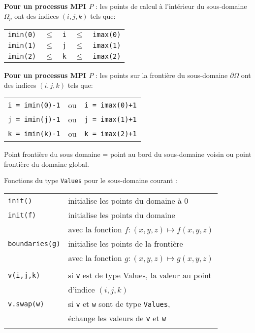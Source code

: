 \documentclass{beamer}
\begin{document}
\begin{frame}
	
\vfill
{\bf Pour un processus MPI $P$} : les points de calcul à l'intérieur du sous-domaine $\Omega_p$ ont des indices $(i,j,k)$ tels que:
\bigskip

\begin{tabular}{lclcl}
	{\tt imin(0)} & $\leq$ & {\tt i} & $\leq$ & {\tt imax(0)} \\
	{\tt imin(1)} & $\leq$ & {\tt j} & $\leq$ & {\tt imax(1)} \\
	{\tt imin(2)} & $\leq$ & {\tt k} & $\leq$ & {\tt imax(2)} \\
\end{tabular}
\vfill

{\bf Pour un processus MPI $P$} : les points sur la frontière du sous-domaine $\partial\Omega$ ont des indices $(i,j,k)$ tels que:
\bigskip

\begin{tabular}{lcl}
	{\tt i = imin(0)-1} & ou & {\tt i = imax(0)+1}  \\
	{\tt j = imin(j)-1} & ou & {\tt j = imax(1)+1}  \\
	{\tt k = imin(k)-1} & ou & {\tt k = imax(2)+1} 
\end{tabular}

\vfill
Point frontière du sous domaine = point au bord du sous-domaine voisin ou point frontière du domaine global.
\vfill
	
	
\end{frame}

\begin{frame}
Fonctions du type {\tt Values} pour le sous-domaine courant :
\bigskip

\begin{tabular}{ll}
	{\tt init()} & initialise les points du domaine à 0 \\
	{\tt init(f)}& initialise les points du domaine \\ & avec la fonction $f : (x,y,z) \mapsto f(x,y,z)$\\
	{\tt boundaries(g)} & initialise les points de la frontière \\ &  avec la fonction $g: (x,y,z) \mapsto g(x,y,z)$\\ \\
	{\tt v(i,j,k)}& si {\tt v} est de type {Values}, la valeur au point \\ &  d'indice $(i,j,k)$ \\
	{\tt v.swap(w)} & si {\tt v} et {\tt w} sont de type {\tt Values}, \\ & échange les valeurs de {\tt v} et {\tt w} \\ \\
\end{tabular}

\end{frame}
\end{document}
